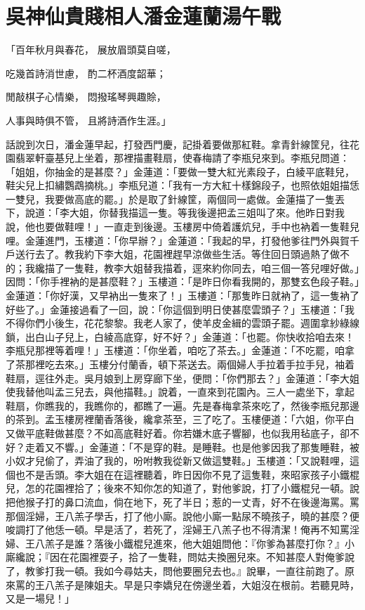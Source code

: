 %

\chapter{吳神仙貴賤相人\KG 潘金蓮蘭湯午戰}

「百年秋月與春花，  展放眉頭莫自嗟，

吃幾首詩消世慮，  酌二杯酒度韶華；

閒敲棋子心情樂，  悶撥瑤琴興趣賒，

人事與時俱不管，  且將詩酒作生涯。」

話說到次日，潘金蓮早起，打發西門慶，記掛着要做那紅鞋。拿青針線筐兒，往花園翡翠軒臺基兒上坐着，那裡描畫鞋扇，使春梅請了李瓶兒來到。李瓶兒問道：「姐姐，你抽金的是甚麼？」金蓮道：「要做一雙大紅光素段子，白綾平底鞋兒，鞋尖兒上扣繡鸚鵡摘桃。」李瓶兒道：「我有一方大紅十樣錦段子，也照依姐姐描恁一雙兒，我要做高底的罷。」於是取了針線筐，兩個同一處做。金蓮描了一隻丟下，說道：「李大姐，你替我描這一隻。等我後邊把孟三姐叫了來。他昨日對我說，他也要做鞋哩！」一直走到後邊。玉樓房中倚着護炕兒，手中也衲着一隻鞋兒哩。金蓮進門，玉樓道：「你早辦？」金蓮道：「我起的早，打發他爹往門外與賀千戶送行去了。教我約下李大姐，花園裡趕早涼做些生活。等住回日頭過熱了做不的；我纔描了一隻鞋，教李大姐替我描着，逕來約你同去，咱三個一答兒哩好做。」因問：「你手裡衲的是甚麼鞋？」玉樓道：「是昨日你看我開的，那雙玄色段子鞋。」金蓮道：「你好漢，又早衲出一隻來了！」玉樓道：「那隻昨日就衲了，這一隻衲了好些了。」金蓮接過看了一回，說：「你這個到明日使甚麼雲頭子？」玉樓道：「我不得你們小後生，花花黎黎。我老人家了，使羊皮金緝的雲頭子罷。週圍拿紗綠線鎖，出白山子兒上，白綾高底穿，好不好？」金蓮道：「也罷。你快收拾咱去來！李瓶兒那裡等着哩！」玉樓道：「你坐着，咱吃了茶去。」金蓮道：「不吃罷，咱拿了茶那裡吃去來。」玉樓分付蘭香，頓下茶送去。兩個婦人手拉着手拉手兒，袖着鞋扇，逕往外走。吳月娘到上房穿廊下坐，便問：「你們那去？」金蓮道：「李大姐使我替他叫孟三兒去，與他描鞋。」說着，一直來到花園內。三人一處坐下，拿起鞋扇，你瞧我的，我瞧你的，都瞧了一遍。先是春梅拿茶來吃了，然後李瓶兒那邊的茶到。孟玉樓房裡蘭香落後，纔拿茶至，三了吃了。玉樓便道：「六姐，你平白又做平底鞋做甚麼？不如高底鞋好着。你若嫌木底子響腳，也似我用毡底子，卻不好？走着又不響。」金蓮道：「不是穿的鞋。是睡鞋。也是他爹因我了那隻睡鞋，被小奴才兒偷了，弄油了我的，吩咐教我從新又做這雙鞋。」玉樓道：「又說鞋哩，這個也不是舌頭。李大姐在在這裡聽着，昨日因你不見了這隻鞋，來昭家孩子小鐵棍兒，怎的花園裡拾了；後來不知你怎的知道了，對他爹說，打了小鐵棍兒一頓。說把他猴子打的鼻口流血，倘在地下，死了半日；惹的一丈青，好不在後邊海罵。罵那個淫婦，王八羔子學舌，打了他小廝。說他小廝一點尿不曉孩子，曉的甚麼？便唆調打了他恁一頓。早是活了，若死了，淫婦王八羔子也不得清潔！俺再不知罵淫婦、王八羔子是誰？落後小鐵棍兒進來，他大姐姐問他：『你爹為甚麼打你？』小廝纔說；『因在花園裡耍子，拾了一隻鞋，問姑夫換圈兒來。不知甚麼人對俺爹說了，教爹打我一頓。我如今尋姑夫，問他要圈兒去也。』說畢，一直往前跑了。原來罵的王八羔子是陳姐夫。早是只李嬌兒在傍邊坐着，大姐沒在根前。若聽見時，又是一場兒！」